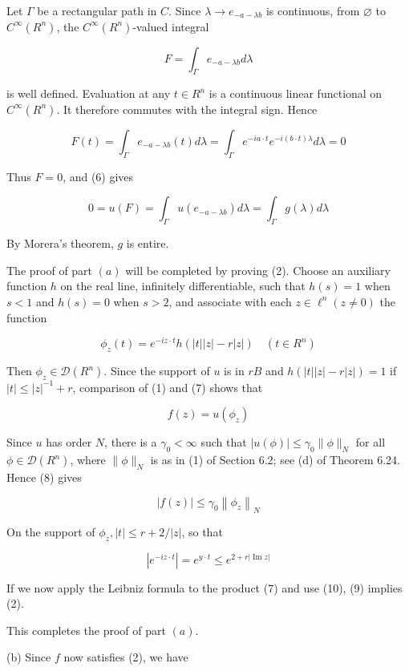 \documentclass[10pt]{article}
\begin{document}
Let $\Gamma$ be a rectangular path in $C$. Since $\lambda \rightarrow e_{-a-\lambda b}$ is continuous, from $\varnothing$ to $C^{\infty}\left(R^{n}\right)$, the $C^{\infty}\left(R^{n}\right)$-valued integral

$$
F=\int_{\Gamma} e_{-a-\lambda b} d \lambda
$$

is well defined. Evaluation at any $t \in R^{n}$ is a continuous linear functional on $C^{\infty}\left(R^{n}\right)$. It therefore commutes with the integral sign. Hence

$$
F(t)=\int_{\Gamma} e_{-a-\lambda b}(t) d \lambda=\int_{\Gamma} e^{-i a \cdot t} e^{-i(b \cdot t) \lambda} d \lambda=0
$$

Thus $F=0$, and (6) gives

$$
0=u(F)=\int_{\Gamma} u\left(e_{-a-\lambda b}\right) d \lambda=\int_{\Gamma} g(\lambda) d \lambda
$$

By Morera's theorem, $g$ is entire.

The proof of part $(a)$ will be completed by proving (2). Choose an auxiliary function $h$ on the real line, infinitely differentiable, such that $h(s)=1$ when $s<1$ and $h(s)=0$ when $s>2$, and associate with each $z \in \ell^{n}(z \neq 0)$ the function

$$
\phi_{z}(t)=e^{-i z \cdot t} h(|t||z|-r|z|) \quad\left(t \in R^{n}\right)
$$

Then $\phi_{z} \in \mathscr{D}\left(R^{n}\right)$. Since the support of $u$ is in $r B$ and $h(|t||z|-r|z|)=1$ if $|t| \leq|z|^{-1}+r$, comparison of (1) and (7) shows that

$$
f(z)=u\left(\phi_{z}\right)
$$

Since $u$ has order $N$, there is a $\gamma_{0}<\infty$ such that $|u(\phi)| \leq \gamma_{0}\|\phi\|_{N}$ for all $\phi \in \mathscr{D}\left(R^{n}\right)$, where $\|\phi\|_{N}$ is as in (1) of Section 6.2; see (d) of Theorem 6.24. Hence (8) gives

$$
|f(z)| \leq \gamma_{0}\left\|\phi_{z}\right\|_{N}
$$

On the support of $\phi_{z},|t| \leq r+2 /|z|$, so that

$$
\left|e^{-i z \cdot t}\right|=e^{y \cdot t} \leq e^{2+r|\operatorname{Im} z|}
$$

If we now apply the Leibniz formula to the product (7) and use (10), (9) implies (2).

This completes the proof of part $(a)$.

(b) Since $f$ now satisfies (2), we have
\end{document}

